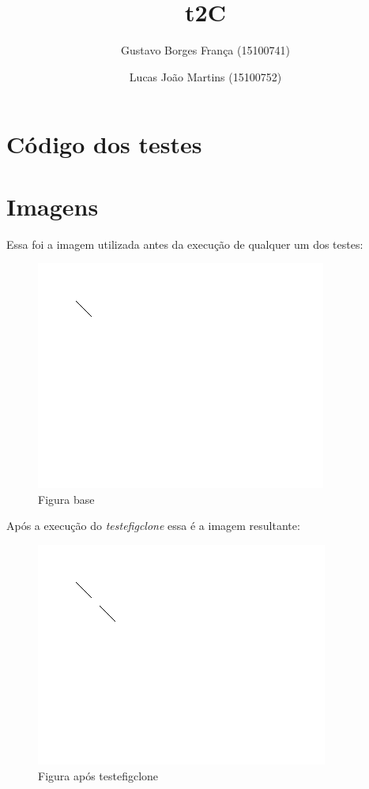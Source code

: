 \documentclass[12pt]{article}
\title{t2C}
\author{Gustavo Borges França (15100741)
        \and
        Lucas João Martins (15100752)}
\date{}
\begin{document}
\maketitle

\section{Código dos testes}


\section{Imagens}
Essa foi a imagem utilizada antes da execução de qualquer um dos testes:
\begin{figure}[H]
  \includegraphics[width=\linewidth]{antes_testes.png}
  \caption{Figura base}
\end{figure}

Após a execução do \emph{testefigclone} essa é a imagem resultante:
\begin{figure}[H]
  \includegraphics[width=\linewidth]{01_depois_testefigclone.png}
  \caption{Figura após testefigclone}
\end{figure}
\end{document}
